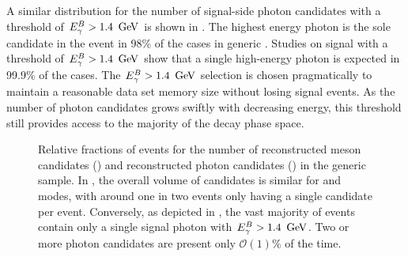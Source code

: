 A similar distribution for the number of signal-side photon candidates with a threshold of ${E^B_{\gamma}}>1.4~\mathrm{\,Ge\kern -0.1em V}$ is shown in .
The highest energy photon is the sole candidate in the event in 98\% of the cases in generic \MC.
Studies on \BtoXsgamma signal \MC with a threshold of ${E^B_{\gamma}}>1.4~\mathrm{\,Ge\kern -0.1em V}$ show that a single high-energy photon is expected in 99.9\% of the cases.
The ${E^B_{\gamma}}>1.4~\mathrm{\,Ge\kern -0.1em V}$ selection is chosen pragmatically to maintain a reasonable data set memory size without losing signal events.
As the number of photon candidates grows swiftly with decreasing energy, this threshold still provides access to the majority of the \BtoXsgamma decay phase space.
\begin{figure}[htbp!]
    \centering
    \caption{\label{fig:reco_candidates} Relative fractions of events for the number of 
    reconstructed \B meson candidates () and
    reconstructed photon candidates () in the generic \MC sample.
    In , the overall volume of candidates is similar for \feiBp and \feiBz modes, 
    with around one in two events only having a single candidate per event.
    Conversely, as depicted in ,
    the vast majority of events contain only a single signal photon with ${E^B_{\gamma}}>1.4~\mathrm{\,Ge\kern -0.1em V}$.
    Two or more photon candidates are present only $\mathcal{O}(1)\%$ of the time.
    }
\end{figure}

